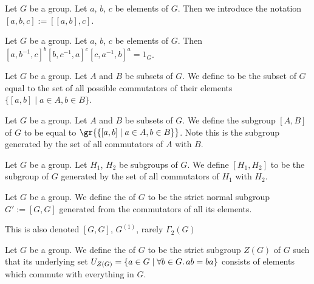 \begin{definition}
Let $G$ be a group.
Let $a$, $b$, $c$ be elements of $G$.
Then we introduce the notation $[a,b,c] := [[a,b],c]$.
\end{definition}

\begin{theorem}
Let $G$ be a group.
Let $a$, $b$, $c$ be elements of $G$.
Then $[a,b^{-1},c]^{b}[b,c^{-1},a]^{c}[c,a^{-1},b]^{a}=1_{G}$.
\end{theorem}

\begin{definition}
Let $G$ be a group.
Let $A$ and $B$ be subsets of $G$.
We define  to be the subset of
$G$ equal to the set of all possible commutators of their elements
$\{[a,b]\mid a\in A,b\in B\}$.
\end{definition}

\begin{definition}
Let $G$ be a group.
Let $A$ and $B$ be subsets of $G$.
We define the subgroup $[A,B]$ of $G$ to be equal to $\gr{\{[a,b]\mid a\in A,b\in B\}}$.
Note this is the subgroup generated by the set of all commutators of
$A$ with $B$.
\end{definition}

\begin{definition}
Let $G$ be a group.
Let $H_{1}$, $H_{2}$ be subgroups of $G$.
We define $[H_{1},H_{2}]$ to be the subgroup of $G$ generated by the
set of all commutators of $H_{1}$ with $H_{2}$.
\end{definition}

\begin{definition}
Let $G$ be a group.
We define the  of $G$ to be the strict normal
subgroup $G':=[G,G]$ generated from the commutators of all its elements.

This is also denoted $[G,G]$, $G^{(1)}$, rarely $\Gamma_{2}(G)$
\end{definition}

\begin{definition}
Let $G$ be a group. 
We define the  of $G$ to be the strict subgroup $Z(G)$
of $G$ such that its underlying set $U_{Z(G)}=\{a\in G\mid\forall b\in G\ldotp ab=ba\}$ 
consists of elements which commute with everything in $G$.
\end{definition}

